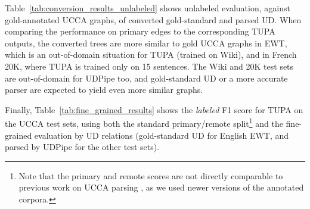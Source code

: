 \documentclass[11pt,a4paper]{article}
\begin{document}
Table~\ref{tab:conversion_results_unlabeled} shows unlabeled evaluation,
against gold-annotated UCCA graphs, of converted gold-standard and parsed UD.
When comparing the performance on primary edges to the corresponding TUPA outputs,
the converted trees are more similar to gold UCCA graphs
in EWT, which is an out-of-domain situation for TUPA (trained on Wiki),
and in French 20K, where TUPA is trained only on 15 sentences.
The Wiki and 20K test sets are out-of-domain for UDPipe too,
and gold-standard UD or a more accurate parser are expected to yield even more similar graphs.

Finally, Table~\ref{tab:fine_grained_results} shows the \textit{labeled} F1 score for TUPA
on the UCCA test sets,
using both the standard primary/remote
split\footnote{Note that the primary and remote scores are not directly comparable to previous work
on UCCA parsing \cite{hershcovich2017a,hershcovich2018multitask},
as we used newer versions of the annotated corpora.}
and the fine-grained evaluation by UD relations
(gold-standard UD for English EWT, and parsed by UDPipe for the other test sets).
\end{document}

